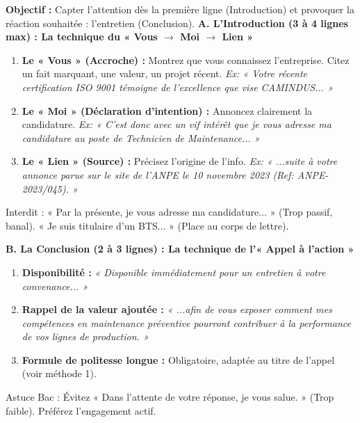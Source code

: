 \documentclass[11pt]{article}
\newcommand{\cle}[1]{{\popxbold\color{popdark}#1}}
\begin{document}
\begin{methode}
\textbf{Objectif :} Capter l'attention dès la première ligne (Introduction) et provoquer la réaction souhaitée : l'entretien (Conclusion).
\medskip
\textbf{A. L'Introduction (3 à 4 lignes max) : La technique du « Vous $\rightarrow$ Moi $\rightarrow$ Lien »}
\begin{enumerate}
\item \textbf{Le « Vous » (Accroche) :} Montrez que vous connaissez l'entreprise. Citez un fait marquant, une valeur, un projet récent. \textit{Ex: « Votre récente certification ISO 9001 témoigne de l'excellence que vise CAMINDUS... »}
\item \textbf{Le « Moi » (Déclaration d'intention) :} Annoncez clairement la candidature. \textit{Ex: « C'est donc avec un vif intérêt que je vous adresse ma candidature au poste de Technicien de Maintenance... »}
\item \textbf{Le « Lien » (Source) :} Précisez l'origine de l'info. \textit{Ex: « ...suite à votre annonce parue sur le site de l'ANPE le 10 novembre 2023 (Ref: ANPE-2023/045). »}
\end{enumerate}
\cle{Interdit :} « Par la présente, je vous adresse ma candidature... » (Trop passif, banal). « Je suis titulaire d'un BTS... » (Place au corps de lettre).

\medskip
\textbf{B. La Conclusion (2 à 3 lignes) : La technique de l'« Appel à l'action »}
\begin{enumerate}
\item \textbf{Disponibilité :} \textit{« Disponible immédiatement pour un entretien à votre convenance... »}
\item \textbf{Rappel de la valeur ajoutée :} \textit{« ...afin de vous exposer comment mes compétences en maintenance préventive pourront contribuer à la performance de vos lignes de production. »}
\item \textbf{Formule de politesse longue :} Obligatoire, adaptée au titre de l'appel (voir méthode 1).
\end{enumerate}
\cle{Astuce Bac :} Évitez « Dans l'attente de votre réponse, je vous salue. » (Trop faible). Préférez l'engagement actif.
\end{methode}
\end{document}

